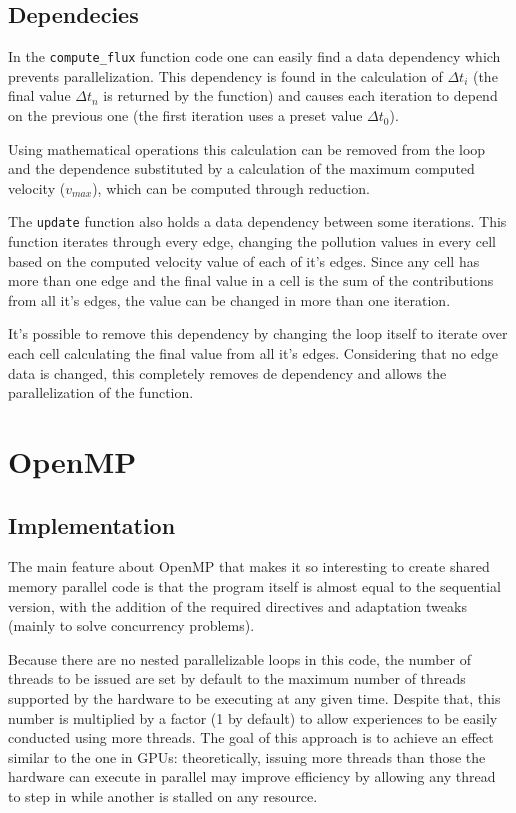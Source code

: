 \documentclass[9pt,twocolumn]{scrartcl}
\begin{document}
\subsection{Dependecies}
In the \texttt{compute\_flux} function code one can easily find a data dependency which prevents parallelization. This dependency is found in the calculation of $\Delta t_{i}$ (the final value $\Delta t_{n}$ is returned by the function) and causes each iteration to depend on the previous one (the first iteration uses a preset value $\Delta t_{0}$).

Using mathematical operations this calculation can be removed from the loop and the dependence substituted by a calculation of the maximum computed velocity ($v_{max}$), which can be computed through reduction.

The \texttt{update} function also holds a data dependency between some iterations. This function iterates through every edge, changing the pollution values in every cell based on the computed velocity value of each of it's edges. Since any cell has more than one edge and the final value in a cell is the sum of the contributions from all it's edges, the value can be changed in more than one iteration.

It's possible to remove this dependency by changing the loop itself to iterate over each cell calculating the final value from all it's edges. Considering that no edge data is changed, this completely removes de dependency and allows the parallelization of the function.

\section{OpenMP}
\label{sec:openmp}
\subsection{Implementation}
The main feature about OpenMP that makes it so interesting to create shared memory parallel code is that the program itself is almost equal to the sequential version, with the addition of the required directives and adaptation tweaks (mainly to solve concurrency problems).

Because there are no nested parallelizable loops in this code, the number of threads to be issued are set by default to the maximum number of threads supported by the hardware to be executing at any given time. Despite that, this number is multiplied by a factor (1 by default) to allow experiences to be easily conducted using more threads. The goal of this approach is to achieve an effect similar to the one in GPUs: theoretically, issuing more threads than those the hardware can execute in parallel may improve efficiency by allowing any thread to step in while another is stalled on any resource.
\end{document}
